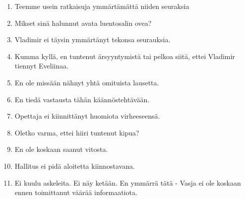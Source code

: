 \documentclass[paper=a4, fontsize=11pt]{scrartcl}
\begin{document}
\begin{enumerate}
    \item Teemme usein ratkaisuja ymmärtämättä niiden seuraksia \\
    \underline{\hspace{12cm}}
    \item Mikset sinä halunnut avata luentosalin ovea? \\
    \underline{\hspace{12cm}}
    \item Vladimir ei täysin ymmärtänyt tekonsa seurauksia.  \\
    \underline{\hspace{12cm}}
    \item Kumma kyllä, en tuntenut ärsyyntymistä tai pelkoa siitä, ettei Vladimir tiennyt Eveliinaa.\\
    \underline{\hspace{12cm}}
    \item En ole missään nähnyt yhtä omituista lausetta.\\
    \underline{\hspace{12cm}}
    \item En tiedä vastausta tähän käännöstehtävään.\\
    \underline{\hspace{12cm}}
    \item Opettaja ei kiinnittänyt huomiota virheeseensä.\\
    \underline{\hspace{12cm}}
    \item Oletko varma, ettei hiiri tuntenut kipua?\\
    \underline{\hspace{12cm}}
    \item En ole koskaan saanut vitosta.\\
    \underline{\hspace{12cm}}
    \item Hallitus ei pidä aloitetta kiinnostavana.\\
    \underline{\hspace{12cm}}
    \item Ei kuulu askeleita. Ei näy ketään. En ymmärrä tätä - Vasja ei ole koskaan ennen toimittanut väärää informaatiota.\\
    \underline{\hspace{12cm}} \\
    \underline{\hspace{12cm}} \\
    \underline{\hspace{12cm}} \\
\end{enumerate}
\end{document}
